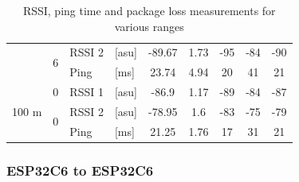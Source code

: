 \begin{table}[H]
\begin{tabular}{|c|c|l|l|c|c|c|c|c|}
        & \multirow{2}{*}{6} & RSSI 2 & [asu] & -89.67 & 1.73 & -95 & -84 & -90 \\\cline{3-9}
        && Ping & [ms] & 23.74 & 4.94 & 20 & 41 & 21 \\\hline\hline
        \multirow{3}{*}{100 m} & \multirow{1}{*}{0} & RSSI 1 & [asu] & -86.9 & 1.17 & -89 & -84 & -87 \\\cline{2-9}\cline{2-9}
        & \multirow{2}{*}{0} & RSSI 2 & [asu] & -78.95 & 1.6 & -83 & -75 & -79 \\\cline{3-9}
        && Ping & [ms] & 21.25 & 1.76 & 17 & 31 & 21 \\\hline
    \end{tabular}
    \vspace{\ftspace}
    \caption{RSSI, ping time and package loss measurements for various ranges}
    \label{tab:rssipingrange_esp32c36}
\end{table}

\subsubsection{ESP32C6 to ESP32C6}

